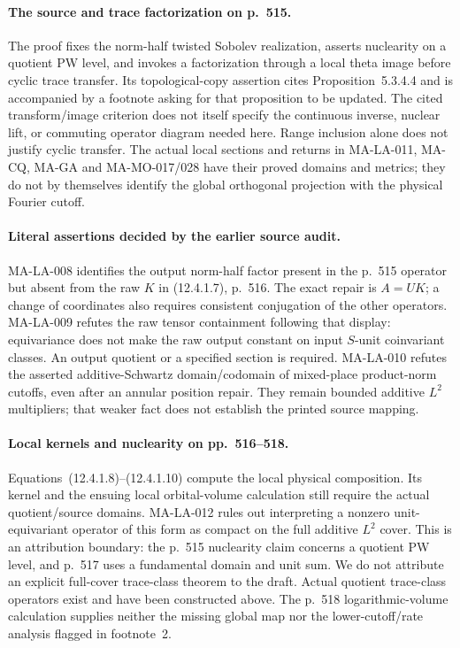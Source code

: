 \paragraph{The source and trace factorization on p.~515.}
The proof fixes the norm-half twisted Sobolev realization,
asserts nuclearity on a quotient PW level, and invokes a
factorization through a local theta image before cyclic trace
transfer.  Its topological-copy assertion cites
Proposition~5.3.4.4 and is accompanied by a footnote asking for
that proposition to be updated.  The cited transform/image
criterion does not itself specify the continuous inverse,
nuclear lift, or commuting operator diagram needed here.
Range inclusion alone does not justify cyclic transfer.
The actual local sections and returns in MA-LA-011, MA-CQ,
MA-GA and MA-MO-017/028 have their proved domains and metrics;
they do not by themselves identify the global orthogonal
projection with the physical Fourier cutoff.

\paragraph{Literal assertions decided by the earlier source audit.}
MA-LA-008 identifies the output norm-half factor present in the
p.~515 operator but absent from the raw $K$ in (12.4.1.7),
p.~516.  The exact repair is $A=UK$; a change of coordinates
also requires consistent conjugation of the other operators.
MA-LA-009 refutes the raw tensor containment following that
display: equivariance does not make the raw output constant on
input $S$-unit coinvariant classes.  An output quotient or a
specified section is required.
MA-LA-010 refutes the asserted additive-Schwartz domain/codomain
of mixed-place product-norm cutoffs, even after an annular
position repair.  They remain bounded additive $L^2$ multipliers;
that weaker fact does not establish the printed source mapping.

\paragraph{Local kernels and nuclearity on pp.~516--518.}
Equations~(12.4.1.8)--(12.4.1.10) compute the local physical
composition.  Its kernel and the ensuing local orbital-volume
calculation still require the actual quotient/source domains.
MA-LA-012 rules out interpreting a nonzero unit-equivariant
operator of this form as compact on the full additive $L^2$
cover.  This is an attribution boundary: the p.~515 nuclearity
claim concerns a quotient PW level, and p.~517 uses a fundamental
domain and unit sum.  We do not attribute an explicit full-cover
trace-class theorem to the draft.  Actual quotient trace-class
operators exist and have been constructed above.
The p.~518 logarithmic-volume calculation supplies neither
the missing global map nor the lower-cutoff/rate analysis
flagged in footnote~2.

